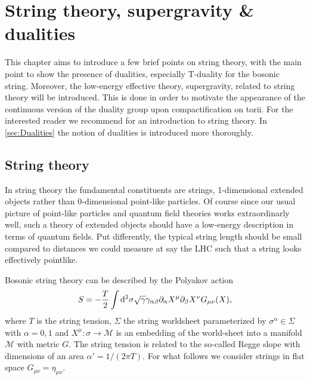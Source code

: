 \chapter{String theory, supergravity \& dualities}


This chapter aims to introduce a few brief points on string theory, with the main point to show the presence of dualities, especially T-duality for the bosonic string. Moreover, the low-energy effective theory, supergravity, related to string theory will be introduced. This is done in order to motivate the appearance of the continuous version of the duality group upon compactification on torii. For the interested reader we recommend \cite{Blumenhagen2013,TongLectureNotes} for an introduction to string theory. In \ref{sec:Dualities} the notion of dualities is introduced more thoroughly. 


\section{String theory}
In string theory the fundamental constituents are strings, 1-dimensional extended objects rather than 0-dimensional point-like particles. Of course since our usual picture of point-like particles and quantum field theories works extraordinarly well, such a theory of extended objects should have a low-energy description in terms of quantum fields. Put differently, the typical string length should be small compared to distances we could measure at say the LHC such that a string looks effectively pointlike. 

Bosonic string theory can be described by the Polyakov action
\begin{equation}
    S = -\frac{T}{2}\int \mathrm{d}^2\sigma \sqrt{\gamma}\gamma_{\alpha\beta}\partial_\alpha X^\mu\partial_\beta X^\nu G_{\mu\nu}(X),
\end{equation}
where $T$ is the string tension, $\Sigma$ the string worldsheet parameterized by $\sigma^{\alpha}\in\Sigma$ with $\alpha=0,1$ and $X^\mu: \sigma \to \mathcal{M}$ is an embedding of the world-sheet into a manifold $\mathcal{M}$ with metric $G$. The string tension is related to the so-called Regge slope with dimensions of an area $\alpha'= 1/(2\pi T)$. For what follows we consider strings in flat space $G_{\mu\nu}=\eta_{\mu\nu}$. 

